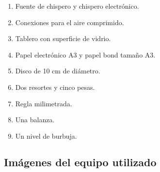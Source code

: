 \documentclass[../main.tex]{subfiles}
\begin{document}
\begin{enumerate}
    \item Fuente de chispero y chispero electrónico.
    \item Conexiones para el aire comprimido. 
    \item Tablero con superficie de vidrio.
    \item Papel electrónico A3 y papel bond tamaño A3.
    \item Disco de 10 cm de diámetro.
    \item Dos resortes y cinco pesas.
    \item Regla milimetrada.
    \item Una balanza.
    \item Un nivel de burbuja.
\end{enumerate}

\subsection*{Imágenes del equipo utilizado}
\end{document}
